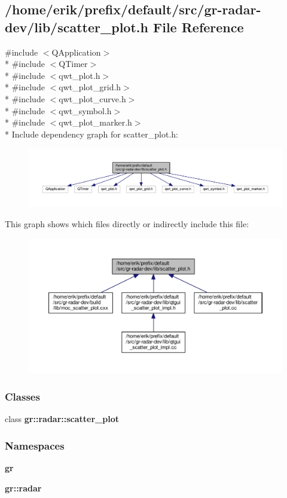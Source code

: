 \subsection{/home/erik/prefix/default/src/gr-\/radar-\/dev/lib/scatter\+\_\+plot.h File Reference}
\label{scatter__plot_8h}
{\ttfamily \#include $<$Q\+Application$>$}\\*
{\ttfamily \#include $<$Q\+Timer$>$}\\*
{\ttfamily \#include $<$qwt\+\_\+plot.\+h$>$}\\*
{\ttfamily \#include $<$qwt\+\_\+plot\+\_\+grid.\+h$>$}\\*
{\ttfamily \#include $<$qwt\+\_\+plot\+\_\+curve.\+h$>$}\\*
{\ttfamily \#include $<$qwt\+\_\+symbol.\+h$>$}\\*
{\ttfamily \#include $<$qwt\+\_\+plot\+\_\+marker.\+h$>$}\\*
Include dependency graph for scatter\+\_\+plot.\+h\+:
\nopagebreak
\begin{figure}[H]
\begin{center}
\leavevmode
\includegraphics[width=350pt]{d7/d71/scatter__plot_8h__incl}
\end{center}
\end{figure}
This graph shows which files directly or indirectly include this file\+:
\nopagebreak
\begin{figure}[H]
\begin{center}
\leavevmode
\includegraphics[width=350pt]{d4/d8d/scatter__plot_8h__dep__incl}
\end{center}
\end{figure}
\subsubsection*{Classes}
\begin{DoxyCompactItemize}
\item 
class {\bf gr\+::radar\+::scatter\+\_\+plot}
\end{DoxyCompactItemize}
\subsubsection*{Namespaces}
\begin{DoxyCompactItemize}
\item 
 {\bf gr}
\item 
 {\bf gr\+::radar}
\end{DoxyCompactItemize}
